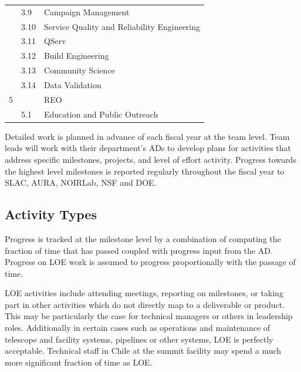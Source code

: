 \begin{longtable}[]{@{}lll@{}}
  & 3.9 & \hspace{0.5cm} Campaign Management  \tabularnewline
  & 3.10 & \hspace{0.5cm} Service Quality and Reliability Engineering  \tabularnewline
  & 3.11 & \hspace{0.5cm} QServ  \tabularnewline
  & 3.12 & \hspace{0.5cm} Build Engineering  \tabularnewline
  & 3.13 & \hspace{0.5cm} Community Science  \tabularnewline
  & 3.14 & \hspace{0.5cm} Data Validation  \tabularnewline
5 & & \gls{REO} \tabularnewline
  & 5.1 & \hspace{0.5cm} Education and Public Outreach  \tabularnewline

\hline

\end{longtable}


Detailed work is planned in advance of each fiscal year at the team level.
Team leads will work with their department's \glspl{AD} to develop plans for activities that address specific milestones, projects, and level of effort activity.
Progress towards the highest level milestones is reported regularly throughout the fiscal year to \gls{SLAC}, \gls{AURA}, \gls{NOIRLab}, \gls{NSF} and \gls{DOE}.


\subsection{Activity Types}
\label{sec:loe}

Progress is tracked at the milestone level by a combination of computing the fraction of time that has passed coupled with progress input from the \gls{AD}.
Progress on \gls{LOE} work is assumed to progress proportionally with the passage of time.

\gls{LOE} activities include attending meetings, reporting on milestones, or taking part in other activities which do not directly map to a deliverable or product.
This may be particularly the case for technical managers or others in leadership roles.
Additionally in certain cases such as operations and maintenance of telescope and facility systems, pipelines or other systems, \gls{LOE} is perfectly acceptable.
Technical staff in Chile at the summit facility may spend a much more significant fraction of time as \gls{LOE}.


